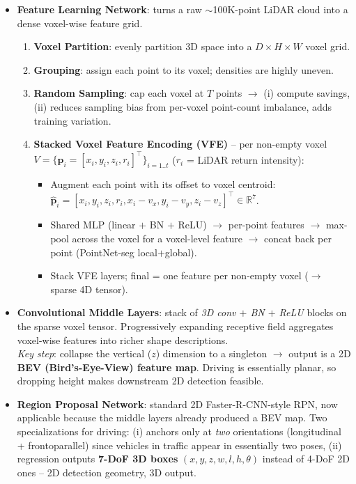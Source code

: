 \documentclass{article}
\begin{document}
\begin{itemize}
    \item \textbf{Feature Learning Network}: turns a raw $\sim$100K-point LiDAR cloud into a dense voxel-wise feature grid.
    \begin{enumerate}
        \item \textbf{Voxel Partition}: evenly partition 3D space into a $D\times H\times W$ voxel grid.
        \item \textbf{Grouping}: assign each point to its voxel; densities are highly uneven.
        \item \textbf{Random Sampling}: cap each voxel at $T$ points $\rightarrow$ (i) compute savings, (ii) reduces sampling bias from per-voxel point-count imbalance, adds training variation.
        \item \textbf{Stacked Voxel Feature Encoding (VFE)} -- per non-empty voxel $V = \{\mathbf{p}_i = [x_i, y_i, z_i, r_i]^\top\}_{i=1..t}$ ($r_i$ = LiDAR return intensity):
        \begin{itemize}
            \item Augment each point with its offset to voxel centroid: $\hat{\mathbf{p}}_i = [x_i, y_i, z_i, r_i, x_i-v_x, y_i-v_y, z_i-v_z]^\top \in \mathbb{R}^7$.
            \item Shared MLP (linear $+$ BN $+$ ReLU) $\rightarrow$ per-point features $\rightarrow$ max-pool across the voxel for a voxel-level feature $\rightarrow$ concat back per point (PointNet-seg local$+$global).
            \item Stack VFE layers; final = one feature per non-empty voxel ($\rightarrow$ sparse 4D tensor).
        \end{itemize}
    \end{enumerate}
    \item \textbf{Convolutional Middle Layers}: stack of \textit{3D conv $+$ BN $+$ ReLU} blocks on the sparse voxel tensor. Progressively expanding receptive field aggregates voxel-wise features into richer shape descriptions. \\ \textit{Key step}: collapse the vertical ($z$) dimension to a singleton $\rightarrow$ output is a 2D \textbf{BEV (Bird's-Eye-View) feature map}. Driving is essentially planar, so dropping height makes downstream 2D detection feasible.
    \item \textbf{Region Proposal Network}: standard 2D Faster-R-CNN-style RPN, now applicable because the middle layers already produced a BEV map. Two specializations for driving: (i) anchors only at \textit{two} orientations (longitudinal + frontoparallel) since vehicles in traffic appear in essentially two poses, (ii) regression outputs \textbf{7-DoF 3D boxes} $(x,y,z,w,l,h,\theta)$ instead of 4-DoF 2D ones -- 2D detection geometry, 3D output.
\end{itemize}
\end{document}
